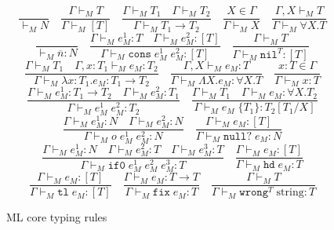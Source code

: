 \begin{figure}[p]
\[
\frac{}{\vdash_{M}N}
\quad
\frac{\Gamma\vdash_{M}T}{\Gamma\vdash_{M}[T]}
\quad
\frac{\Gamma\vdash_{M}T_{1}\quad\Gamma\vdash_{M}T_{2}}{\Gamma\vdash_{M}T_{1}\rightarrow T_{2}}
\quad
\frac{X\in\Gamma}{\Gamma\vdash_{M}X}
\quad
\frac{\Gamma,X\vdash_{M}T}{\Gamma\vdash_{M}\forall X.T}
\]
\bigskip
\[
\frac{}{\vdash_{M}\overline{n}:N}
\quad
\frac{\Gamma\vdash_{M}e_{M}^{1}:T\quad\Gamma\vdash_{M}e_{M}^{2}:[T]}{\Gamma\vdash_{M}\mathtt{cons}\;e_{M}^{1}\;e_{M}^{2}:[T]}
\quad
\frac{\Gamma\vdash_{M}T}{\Gamma\vdash_{M}\mathtt{nil}^{T}:[T]}
\]
\[
\frac{\Gamma\vdash_{M}T_{1}\quad\Gamma,x:T_{1}\vdash_{M}e_{M}:T_{2}}{\Gamma\vdash_{M}\lambda x:T_{1}.e_{M}:T_{1}\rightarrow T_{2}}
\quad
\frac{\Gamma,X\vdash_{M}e_{M}:T}{\Gamma\vdash_{M}\Lambda X.e_{M}:\forall X.T}
\quad
\frac{x:T\in\Gamma}{\Gamma\vdash_{M}x:T}
\]
\[
\frac{\Gamma\vdash_{M}e_{M}^{1}:T_{1}\rightarrow T_{2}\quad\Gamma\vdash_{M}e_{M}^{2}:T_{1}}{\Gamma\vdash_{M}e_{M}^{1}\;e_{M}^{2}:T_{2}}
\quad
\frac{\Gamma\vdash_{M}T_{1}\quad\Gamma\vdash_{M}e_{M}:\forall X.T_{2}}{\Gamma\vdash_{M}e_{M}\;\lbrace T_{1}\rbrace:T_{2}[T_{1}/X]}
\]
\[
\frac{\Gamma\vdash_{M}e_{M}^{1}:N\quad\Gamma\vdash_{M}e_{M}^{2}:N}{\Gamma\vdash_{M}o\;e_{M}^{1}\;e_{M}^{2}:N}
\quad
\frac{\Gamma\vdash_{M}e_{M}:[T]}{\Gamma\vdash_{M}\mathtt{null?}\;e_{M}:N}
\]
\[
\frac{\Gamma\vdash_{M}e_{M}^{1}:N\quad\Gamma\vdash_{M}e_{M}^{2}:T\quad\Gamma\vdash_{M}e_{M}^{3}:T}{\Gamma\vdash_{M}\mathtt{if0}\;e_{M}^{1}\;e_{M}^{2}\;e_{M}^{3}:T}
\quad
\frac{\Gamma\vdash_{M}e_{M}:[T]}{\Gamma\vdash_{M}\mathtt{hd}\;e_{M}:T}
\]
\[
\frac{\Gamma\vdash_{M}e_{M}:[T]}{\Gamma\vdash_{M}\mathtt{tl}\;e_{M}:[T]}
\quad
\frac{\Gamma\vdash_{M}e_{M}:T\rightarrow T}{\Gamma\vdash_{M}\mathtt{fix}\;e_{M}:T}
\quad
\frac{\Gamma\vdash_{M}T}{\Gamma\vdash_{M}\mathtt{wrong}^{T}\;\mathrm{string}:T}
\]
\caption{ML core typing rules}
\label{cmtr}
\end{figure}